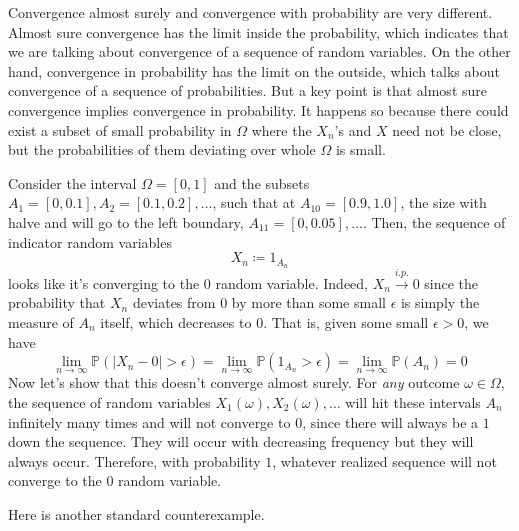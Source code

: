     Convergence almost surely and convergence with probability are very different. Almost sure convergence has the limit inside the probability, which indicates that we are talking about convergence of a sequence of random variables. On the other hand, convergence in probability has the limit on the outside, which talks about convergence of a sequence of probabilities. But a key point is that almost sure convergence implies convergence in probability. It happens so because there could exist a subset of small probability in $\Omega$ where the $X_n$'s and $X$ need not be close, but the probabilities of them deviating over whole $\Omega$ is small. 

    \begin{example}
      Consider the interval $\Omega = [0, 1]$ and the subsets $A_1 = [0, 0.1], A_2 = [0.1, 0.2], \ldots$, such that at $A_{10} = [0.9, 1.0]$, the size with halve and will go to the left boundary, $A_{11} = [0, 0.05], \ldots$. Then, the sequence of indicator random variables 
      \begin{equation}
        X_n \coloneqq 1_{A_n}
      \end{equation}
      looks like it's converging to the $0$ random variable. Indeed, $X_n \xrightarrow{i.p.} 0$ since the probability that $X_n$ deviates from $0$ by more than some small $\epsilon$ is simply the measure of $A_n$ itself, which decreases to $0$. That is, given some small $\epsilon > 0$, we have 
      \begin{equation}
        \lim_{n \rightarrow \infty} \mathbb{P} (|X_n - 0| > \epsilon) = \lim_{n \rightarrow \infty} \mathbb{P}(1_{A_n} > \epsilon ) = \lim_{n \rightarrow \infty} \mathbb{P}(A_n) = 0
      \end{equation}
      Now let's show that this doesn't converge almost surely. For \textit{any} outcome $\omega \in \Omega$, the sequence of random variables $X_1(\omega), X_2(\omega), \ldots$ will hit these intervals $A_n$ infinitely many times and will not converge to $0$, since there will always be a $1$ down the sequence. They will occur with decreasing frequency but they will always occur. Therefore, with probability $1$, whatever realized sequence will not converge to the $0$ random variable. 
    \end{example}

    Here is another standard counterexample. 

